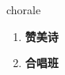 
\begin{frame}
{\huge chorale}
\begin{center}
\begin{enumerate}\Large
  \item \textbf{赞美诗}
  \item \textbf{合唱班}
\end{enumerate}
\end{center}
\end{frame}
